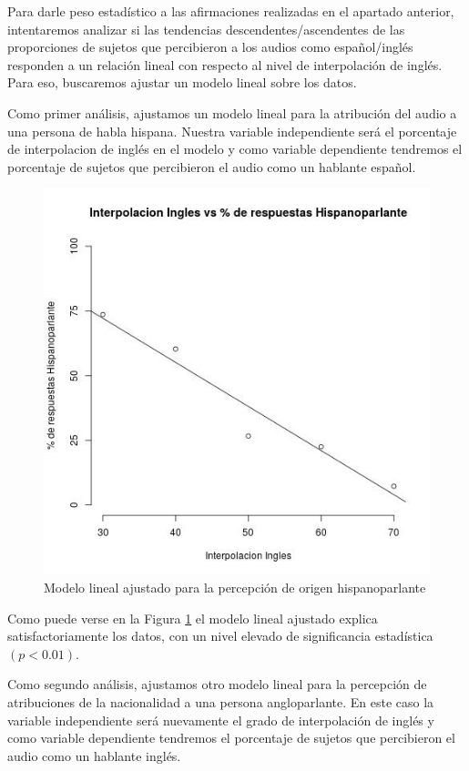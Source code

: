Para darle peso estadístico a las afirmaciones realizadas en el apartado anterior, intentaremos analizar si las tendencias descendentes/ascendentes de las proporciones de sujetos que percibieron a los audios como español/inglés responden a un relación lineal con respecto al nivel de interpolación de inglés. Para eso, buscaremos ajustar un modelo lineal sobre los datos.

Como primer análisis, ajustamos un modelo lineal para la atribución del audio a una persona de habla hispana. Nuestra variable independiente será el porcentaje de interpolacion de inglés en el modelo y como variable dependiente tendremos el porcentaje de sujetos que percibieron el audio como un hablante español.

\begin{figure}
\begin{center}
\includegraphics[trim={0 0 0 1.5cm},clip,width=.5\textwidth]{imagenes/estadistica/spanish.jpg}
\end{center}
\caption{Modelo lineal ajustado para la percepción de origen hispanoparlante}
\label{stadisticSpanish}
\end{figure}

Como puede verse en la Figura \ref{stadisticSpanish} el modelo lineal ajustado explica satisfactoriamente los datos, con un nivel elevado de significancia estadística $(p<0.01)$.

Como segundo análisis, ajustamos otro modelo lineal para la percepción de atribuciones de la nacionalidad a una persona angloparlante. En este caso la variable independiente será nuevamente el grado de interpolación de inglés y como variable dependiente tendremos el porcentaje de sujetos que percibieron el audio como un hablante inglés.

